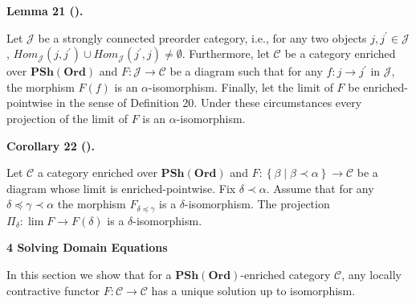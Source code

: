  
 
 
\par\medskip\noindent\textbf{Lemma 21 ().}\par
 
 
Let $\mathcal{J}$ be a strongly connected preorder category, i.e., for any two objects $j,j^{\prime}\in\mathcal{J}$, $\mathit{Hom}_{\mathcal{J}}(j,j^{\prime})\cup\mathit{Hom}_{\mathcal{J}}(j^{\prime},j)\neq\emptyset$. Furthermore, let $\mathcal{C}$ be a category enriched over $\mathbf{PSh}(\mathbf{Ord})$ and $F:\mathcal{J}\to\mathcal{C}$ be a diagram such that for any $f:j\to j^{\prime}$ in $\mathcal{J}$, the morphism $F(f)$ is an $\alpha$-isomorphism. Finally, let the limit of $F$ be enriched-pointwise in the sense of Definition 20. Under these circumstances every projection of the limit of $F$ is an $\alpha$-isomorphism.\par
 
 
 
 
\par\medskip\noindent\textbf{Corollary 22 ().}\par
 
 
Let $\mathcal{C}$ a category enriched over $\mathbf{PSh}(\mathbf{Ord})$ and $F:\left\{\beta\middle|\beta\prec\alpha\right\}\to\mathcal{C}$ be a diagram whose limit is enriched-pointwise. Fix $\delta\prec\alpha$. Assume that for any $\delta\preceq\gamma\prec\alpha$ the morphism $F_{\delta\preceq\gamma}$ is a $\delta$-isomorphism. The projection $\Pi_{\delta}:\lim F\to F(\delta)$ is a $\delta$-isomorphism.\par
 
 
 
 


 
\par\medskip\noindent\textbf{4 Solving Domain Equations}\par
 
 
In this section we show that for a $\mathbf{PSh}(\mathbf{Ord})$-enriched category $\mathcal{C}$, any locally contractive functor $F:\mathcal{C}\to\mathcal{C}$ has a unique solution up to isomorphism.\par
 
